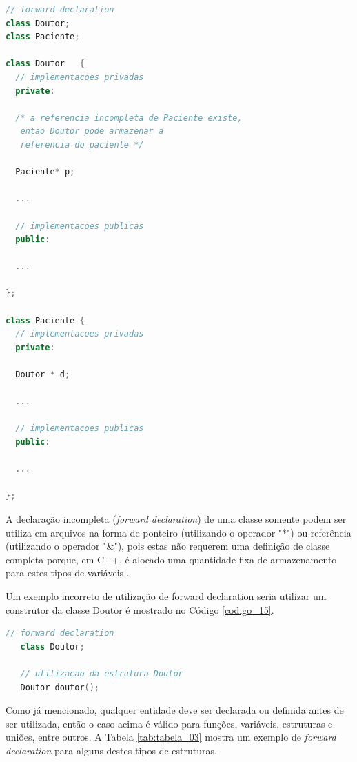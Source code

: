 \begin{lstlisting}[language=C++,frame=single,captionpos=b,caption={ 
								Implementação de classes Paciente e
							 Doutor utilizando forward declaration},
                                                    label=codigo_14]
// forward declaration
class Doutor;   
class Paciente; 

class Doutor   {
  // implementacoes privadas
  private:

  /* a referencia incompleta de Paciente existe,
   entao Doutor pode armazenar a 
   referencia do paciente */

  Paciente* p; 
  
  ... 

  // implementacoes publicas
  public: 

  ...
 
};

class Paciente {
  // implementacoes privadas
  private:
	
  Doutor * d; 

  ... 
	
  // implementacoes publicas
  public: 

  ...

};

\end{lstlisting}

A declaração incompleta (\textit{forward declaration}) de uma classe somente podem
 ser utiliza em arquivos na forma de ponteiro (utilizando o operador "*")
 ou referência (utilizando o operador "\&"), pois estas não requerem uma
 definição de classe completa porque, em C++, é alocado uma quantidade fixa
 de armazenamento para estes tipos de variáveis \cite{ref43}.

Um exemplo incorreto de utilização de forward declaration seria utilizar
 um construtor da classe Doutor é mostrado no Código \ref{codigo_15}.


\begin{lstlisting}[language=C++,frame=single,captionpos=b,caption={
                   Uso incorreto de Forward Declaration},
                                                label=codigo_15]
   // forward declaration
   class Doutor;

   // utilizacao da estrutura Doutor
   Doutor doutor();

\end{lstlisting}

Como já mencionado, qualquer entidade deve ser declarada ou definida antes
 de ser utilizada, então o caso acima é válido para funções, variáveis,
 estruturas e uniões, entre outros. A Tabela \ref{tab:tabela_03} mostra
 um exemplo de \textit{forward declaration} para alguns destes tipos
 de estruturas.

